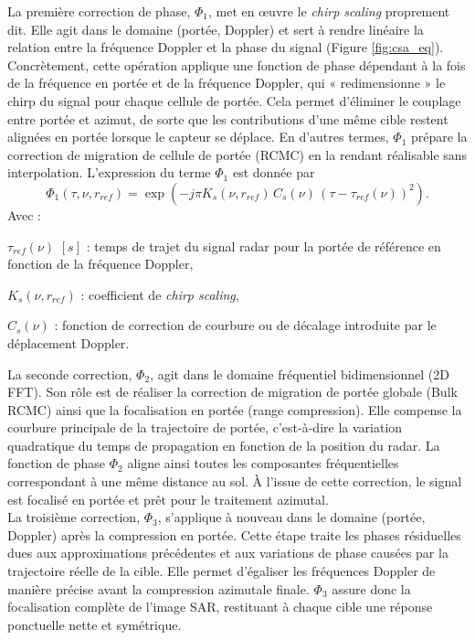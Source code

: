 \FloatBarrier
La première correction de phase, $\Phi_1$, met en œuvre le \textit{chirp scaling} proprement dit. Elle agit dans le domaine (portée, Doppler) et sert à rendre linéaire la relation entre la fréquence Doppler et la phase du signal (Figure \ref{fig:csa_eq}). Concrètement, cette opération applique une fonction de phase dépendant à la fois de la fréquence en portée et de la fréquence Doppler, qui « redimensionne » le chirp du signal pour chaque cellule de portée. Cela permet d’éliminer le couplage entre portée et azimut, de sorte que les contributions d’une même cible restent alignées en portée lorsque le capteur se déplace. En d’autres termes, $\Phi_1$ prépare la correction de migration de cellule de portée (RCMC) en la rendant réalisable sans interpolation. L'expression du terme $\Phi_1$ est donnée par
\begin{equation}
    \Phi_1(\tau, \nu, r_{ref}) = \exp \left( -j\pi K_s(\nu, r_{ref}) \, C_s(\nu)\, ( \tau - \tau_{ref}(\nu))^2 \right). 
\end{equation}
Avec :
\begin{description}
    \item $\tau_{ref}(\nu)$ $[s]$ : temps de trajet du signal radar pour la portée de référence en fonction de la fréquence Doppler,
    \item $K_s(\nu, r_{ref})$ : coefficient de \textit{chirp scaling},
    \item $C_s(\nu)$ : fonction de correction de courbure ou de décalage introduite par le déplacement Doppler.
\end{description}
\vspace{2em}
La seconde correction, $\Phi_2$, agit dans le domaine fréquentiel bidimensionnel (2D FFT). Son rôle est de réaliser la correction de migration de portée globale (Bulk RCMC) ainsi que la focalisation en portée (range compression). Elle compense la courbure principale de la trajectoire de portée, c’est-à-dire la variation quadratique du temps de propagation en fonction de la position du radar. La fonction de phase $\Phi_2$ aligne ainsi toutes les composantes fréquentielles correspondant à une même distance au sol. À l’issue de cette correction, le signal est focalisé en portée et prêt pour le traitement azimutal. \\
La troisième correction, $\Phi_3$, s’applique à nouveau dans le domaine (portée, Doppler) après la compression en portée. Cette étape traite les phases résiduelles dues aux approximations précédentes et aux variations de phase causées par la trajectoire réelle de la cible. Elle permet d’égaliser les fréquences Doppler de manière précise avant la compression azimutale finale. $\Phi_3$ assure donc la focalisation complète de l’image SAR, restituant à chaque cible une réponse ponctuelle nette et symétrique.

